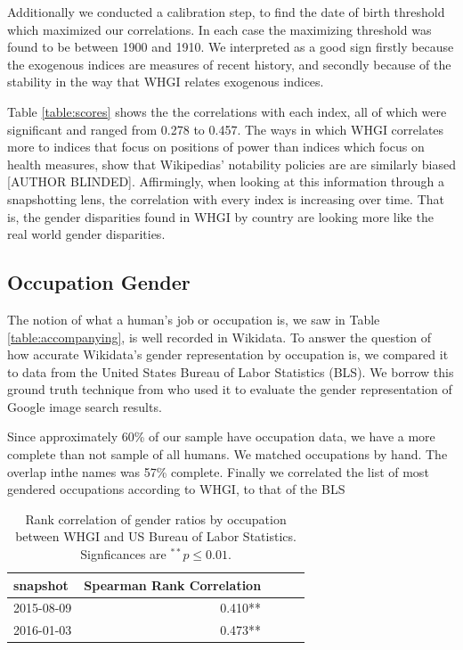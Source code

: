 \documentclass[letterpaper]{article}
\begin{document}
Additionally we conducted a calibration step, to find the date of birth threshold which maximized our correlations. In each case the maximizing threshold was found to be between 1900 and 1910. We interpreted as a good sign firstly because the exogenous indices are measures of recent history, and secondly because of the stability in the way that WHGI relates exogenous indices.

Table \ref{table:scores} shows the the correlations with each index, all of which were significant and ranged from 0.278 to 0.457. The ways in which WHGI correlates more to indices that focus on positions of power than indices which focus on health measures, show that Wikipedias' notability policies are are similarly biased [AUTHOR BLINDED].  Affirmingly, when looking at this information through a snapshotting lens, the correlation with every index is increasing over time. That is, the gender disparities found in WHGI by country are looking more like the real world gender disparities. 


\subsection{Occupation Gender}
The notion of what a human's job or occupation is, we saw in Table \ref{table:accompanying}, is well recorded in Wikidata. To answer the question of how accurate Wikidata's gender representation by occupation is, we compared it to data from the United States Bureau of Labor Statistics (BLS). We borrow this ground truth technique from \cite{kay_unequal_2015} who used it to evaluate the gender representation of Google image search results.


Since approximately 60\% of our sample have occupation data, we have a more
complete than not sample of all humans. We matched occupations by hand. The
overlap inthe names was 57\% complete. Finally we correlated the list of most gendered occupations according to WHGI, to that of the BLS

\begin{table}
\caption{Rank correlation of gender ratios by occupation between WHGI and US
Bureau of Labor Statistics. Signficances are $ ^{**}p\leq 0.01$.}
\label{table:bls}
\begin{tabular}{lrrrr}
\toprule
snapshot &  Spearman Rank Correlation \\
\midrule
2015-08-09 & 0.410**  \\
2016-01-03 & 0.473**  \\
\bottomrule
\end{tabular}
\end{table}
\end{document}
